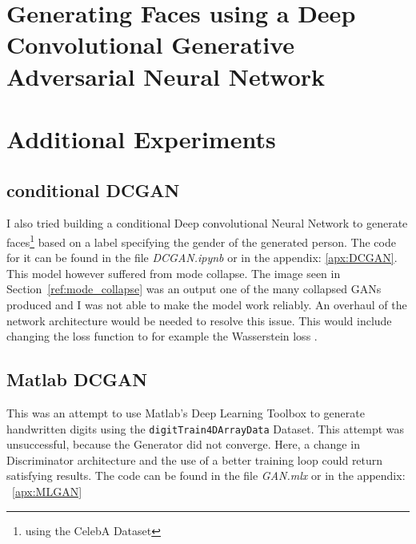 \documentclass{article}
\begin{document}
\section{Generating Faces using a Deep Convolutional Generative Adversarial Neural Network}
\label{ref:face_dcgan}


\section{Additional Experiments}
\subsection{conditional DCGAN}
I also tried building a conditional Deep convolutional Neural Network to generate faces\footnote{using the CelebA Dataset\autocite{liu2015faceattributes}} based on a label specifying the gender of the generated person. The code for it can be found in the file \textit{DCGAN.ipynb} or in the appendix: \ref{apx:DCGAN}. This model however suffered from mode collapse. The image seen in Section~\ref{ref:mode_collapse} was an output one of the many collapsed GANs produced and I was not able to make the model work reliably. An overhaul of the network architecture would be needed to resolve this issue. This would include changing the loss function to for example the Wasserstein loss \autocite{arjovsky_wasserstein_2017}. \\

\subsection{Matlab DCGAN}
This was an attempt to use Matlab's Deep Learning Toolbox to generate handwritten digits using the \texttt{digitTrain4DArrayData} Dataset. This attempt was unsuccessful, because the Generator did not converge. Here, a change in Discriminator architecture and the use of a better training loop could return satisfying results. The code can be found in the file \textit{GAN.mlx} or in the appendix: ~\ref{apx:MLGAN}
\end{document}
